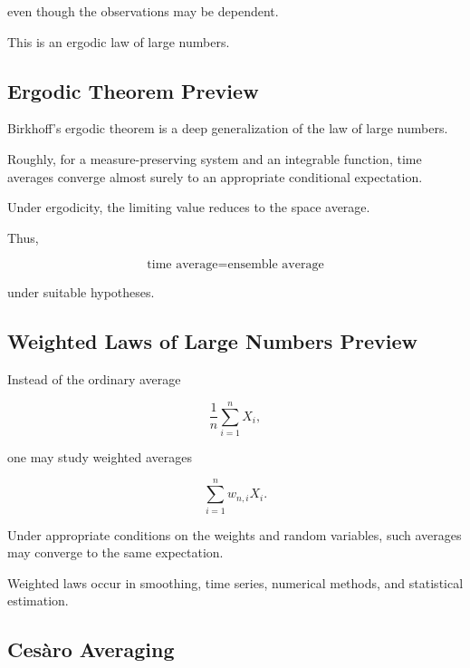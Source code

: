 even though the observations may be dependent.

This is an ergodic law of large numbers.

\subsection{Ergodic Theorem Preview}
\label{subsec:ergodic-theorem-preview}

Birkhoff's ergodic theorem is a deep generalization of the law of large
numbers.

Roughly, for a measure-preserving system and an integrable function,
time averages converge almost surely to an appropriate conditional
expectation.

Under ergodicity, the limiting value reduces to the space average.

Thus,

\[
\boxed{
\text{time average}
=
\text{ensemble average}
}
\]

under suitable hypotheses.

\subsection{Weighted Laws of Large Numbers Preview}
\label{subsec:weighted-lln-preview}

Instead of the ordinary average

\[
\frac1n
\sum_{i=1}^{n}X_i,
\]

one may study weighted averages

\[
\boxed{
\sum_{i=1}^{n}
w_{n,i}X_i.
}
\]

Under appropriate conditions on the weights and random variables, such
averages may converge to the same expectation.

Weighted laws occur in smoothing, time series, numerical methods, and
statistical estimation.

\subsection{Cesàro Averaging}
\label{subsec:cesaro-averaging-lln}

